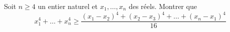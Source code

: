 Soit $n \ge 4$ un entier naturel et $x_1, \dots, x_n$ des réels. Montrer que
$$x_1^4 + \dots + x_n^4 \ge \dfrac{(x_1 - x_2)^4 + (x_2 - x_3)^4 + \dots + (x_n - x_1)^4}{16}$$